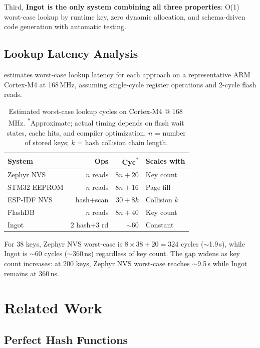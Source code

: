 \documentclass[10pt,twocolumn,letterpaper]{article}
\begin{document}
Third, \textbf{Ingot is the only system combining all three
properties}: O(1) worst-case lookup by runtime key, zero dynamic
allocation, and schema-driven code generation with automatic testing.

\subsection{Lookup Latency Analysis}

 estimates worst-case lookup latency for each
approach on a representative ARM Cortex-M4 at 168\,MHz, assuming
single-cycle register operations and 2-cycle flash reads.

\begin{table}[t]
\centering
\footnotesize
\setlength{\tabcolsep}{3pt}
\begin{tabular}{@{}lrrl@{}}
\toprule
\textbf{System} & \textbf{Ops} & \textbf{Cyc}\textsuperscript{$\ast$} & \textbf{Scales with} \\
\midrule
Zephyr NVS & $n$ reads & $8n\!+\!20$ & Key count \\
STM32 EEPROM & $n$ reads & $8n\!+\!16$ & Page fill \\
ESP-IDF NVS & hash+scan & $30\!+\!8k$ & Collision $k$ \\
FlashDB & $n$ reads & $8n\!+\!40$ & Key count \\
Ingot & 2 hash+3 rd & $\sim$60 & Constant \\
\bottomrule
\end{tabular}
\caption{Estimated worst-case lookup cycles on Cortex-M4 @ 168\,MHz.
\textsuperscript{$\ast$}Approximate; actual timing depends on flash
wait states, cache hits, and compiler optimization.  $n$ = number of
stored keys; $k$ = hash collision chain length.}
\label{tab:latency}
\end{table}

For 38 keys, Zephyr NVS worst-case is $8 \times 38 + 20 = 324$
cycles ($\sim$1.9\,\textmu s), while Ingot is $\sim$60 cycles
($\sim$360\,ns) regardless of key count.  The gap widens as key count
increases: at 200 keys, Zephyr NVS worst-case reaches $\sim$9.5\,\textmu s
while Ingot remains at 360\,ns.

\section{Related Work}
\label{sec:related}

\subsection{Perfect Hash Functions}
\end{document}
